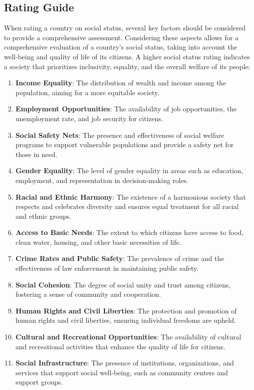 \subsection{Rating Guide}
When rating a country on social status, several key factors
should be considered to provide a comprehensive assessment.
Considering these aspects allows for a comprehensive evaluation
of a country's social status, taking into account the well-being
and quality of life of its citizens. A higher social status rating
indicates a society that prioritizes inclusivity, equality, and the
overall welfare of its people:
\begin{enumerate} 
  \item \textbf{Income Equality}: The distribution of wealth and
  income among the population, aiming for a more equitable society.
  
  \item \textbf{Employment Opportunities}: The availability of
  job opportunities, the unemployment rate, and job security
  for citizens.
  
  \item \textbf{Social Safety Nets}: The presence and effectiveness
  of social welfare programs to support vulnerable populations and
  provide a safety net for those in need.
  
  \item \textbf{Gender Equality}: The level of gender equality in
  areas such as education, employment, and representation in
  decision-making roles.
  
  \item \textbf{Racial and Ethnic Harmony}: The existence of a
  harmonious society that respects and celebrates diversity and
  ensures equal treatment for all racial and ethnic groups.
  
  \item \textbf{Access to Basic Needs}: The extent to which citizens
  have access to food, clean water, housing, and other basic
  necessities of life.
  
  \item \textbf{Crime Rates and Public Safety}: The prevalence of
  crime and the effectiveness of law enforcement in maintaining
  public safety.
  
  \item \textbf{Social Cohesion}: The degree of social unity and
  trust among citizens, fostering a sense of community and cooperation.
  
  \item \textbf{Human Rights and Civil Liberties}: The protection and
  promotion of human rights and civil liberties, ensuring individual
  freedoms are upheld.
  
  \item \textbf{Cultural and Recreational Opportunities}: The
  availability of cultural and recreational activities that
  enhance the quality of life for citizens.
  
  \item \textbf{Social Infrastructure}: The presence of
  institutions, organizations, and services that support
  social well-being, such as community centers and support
  groups.
\end{enumerate}


